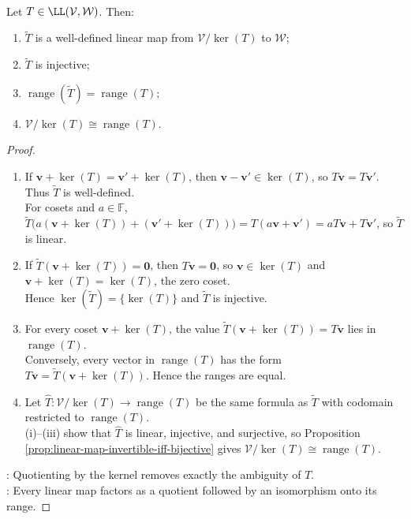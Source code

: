 \begin{theorem} \label{thm:quotient-by-kernel-is-range} \\
Let $T\in\LL(\mathcal{V},\mathcal{W})$. Then:
\begin{enumerate}[label=(\roman*)]
\setlength{\itemsep}{0pt}
\item $\widetilde{T}$ is a well-defined linear map from $\mathcal{V}/\ker(T)$ to $\mathcal{W}$;
\item $\widetilde{T}$ is injective;
\item $\operatorname{range}(\widetilde{T})=\operatorname{range}(T)$;
\item $\mathcal{V}/\ker(T)\cong\operatorname{range}(T)$.
\end{enumerate}
\begin{proof}
\begin{enumerate}[label=(\roman*)]
\setlength{\itemsep}{0pt}
\item If $\mathbf{v}+\ker(T)=\mathbf{v}'+\ker(T)$, then $\mathbf{v}-\mathbf{v}'\in\ker(T)$, so $T\mathbf{v}=T\mathbf{v}'$. Thus $\widetilde{T}$ is well-defined.\\
For cosets and $a\in\mathbb{F}$, $\widetilde{T}\big(a(\mathbf{v}+\ker(T))+(\mathbf{v}'+\ker(T))\big) =T(a\mathbf{v}+\mathbf{v}') =aT\mathbf{v}+T\mathbf{v}'$, so $\widetilde{T}$ is linear.
\item If $\widetilde{T}(\mathbf{v}+\ker(T))=\mathbf{0}$, then $T\mathbf{v}=\mathbf{0}$, so $\mathbf{v}\in\ker(T)$ and $\mathbf{v}+\ker(T)=\ker(T)$, the zero coset.\\
Hence $\ker(\widetilde{T})=\{\ker(T)\}$ and $\widetilde{T}$ is injective.
\item For every coset $\mathbf{v}+\ker(T)$, the value $\widetilde{T}(\mathbf{v}+\ker(T))=T\mathbf{v}$ lies in $\operatorname{range}(T)$.\\
Conversely, every vector in $\operatorname{range}(T)$ has the form $T\mathbf{v}=\widetilde{T}(\mathbf{v}+\ker(T))$. Hence the ranges are equal.
\item Let $\widehat{T}:\mathcal{V}/\ker(T)\to\operatorname{range}(T)$ be the same formula as $\widetilde{T}$ with codomain restricted to $\operatorname{range}(T)$.\\
(i)--(iii) show that $\widehat{T}$ is linear, injective, and surjective, so Proposition \ref{prop:linear-map-invertible-iff-bijective} gives $\mathcal{V}/\ker(T)\cong\operatorname{range}(T)$.
\end{enumerate}
: Quotienting by the kernel removes exactly the ambiguity of $T$.\\
: Every linear map factors as a quotient followed by an isomorphism onto its range.
\end{proof}
\end{theorem}

